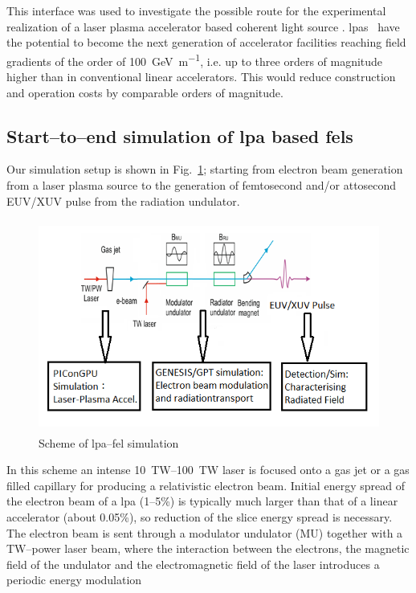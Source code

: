 This interface was used to investigate the possible
route for the experimental realization of a laser plasma accelerator based coherent
light source \cite{Emma2004}. \Glspl{lpa}~\cite{Leemans2006,Esarey2009,Tajima1979} have the potential to become the next
generation of accelerator facilities reaching field gradients of the order of
\SI{100}{\giga\electronvolt\per\metre}, i.e. up to three orders of magnitude
higher than in conventional linear accelerators. This would reduce construction
and operation costs by comparable orders of magnitude.

\subsection{Start--to--end simulation of \gls{lpa} based \glspl{fel}\label{sec:lwfa_s2e}}
Our simulation setup is shown in Fig.~\ref{fig:lwfa-setup}; starting from electron
beam generation from a laser plasma source to the generation of femtosecond
and/or attosecond EUV/XUV pulse from the radiation undulator.
%
\begin{figure}[ht]
  \includegraphics[width=5.4165in,height=2.7374in]{figures/lwfafel-img001.png}
  \caption{Scheme of \gls{lpa}--\gls{fel} simulation}
  \label{fig:lwfa-setup}
\end{figure}
%
In this scheme an intense
\SIrange{10}{100}{\tera\watt}
laser is focused onto a gas jet or a gas filled capillary for producing a
relativistic electron beam. Initial energy spread of the electron beam of a
\gls{lpa} (\numrange{1}{5}\%) is typically much larger than that of a linear accelerator
(about \num{0.05}\%), so
reduction of the slice energy spread is necessary. The electron beam is sent
through a modulator undulator (MU) together with a TW--power laser beam, where
the interaction between the electrons, the magnetic field of the undulator and
the electromagnetic field of the laser introduces a periodic energy modulation
